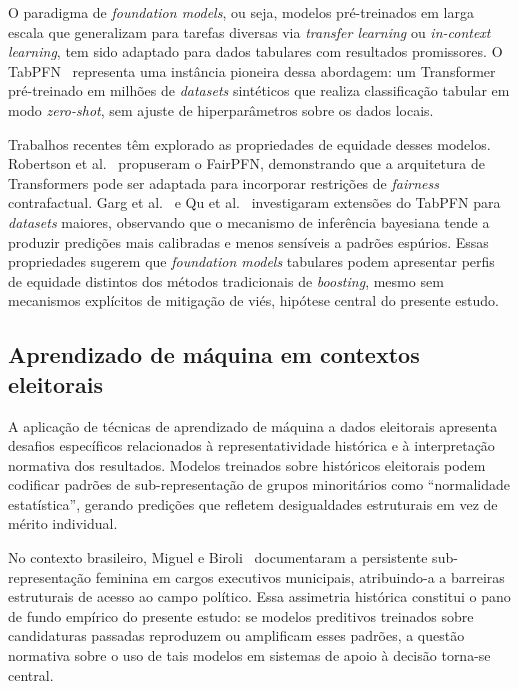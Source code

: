 \documentclass[12pt]{article}
\begin{document}
O paradigma de \textit{foundation models}, ou seja, modelos pré-treinados em larga escala que generalizam para tarefas diversas via \textit{transfer learning} ou \textit{in-context learning}, tem sido adaptado para dados tabulares com resultados promissores. O TabPFN~\cite{hollmann:2022} representa uma instância pioneira dessa abordagem: um Transformer pré-treinado em milhões de \textit{datasets} sintéticos que realiza classificação tabular em modo \textit{zero-shot}, sem ajuste de hiperparâmetros sobre os dados locais.

Trabalhos recentes têm explorado as propriedades de equidade desses modelos. Robertson et al.~\cite{robertson:2024} propuseram o FairPFN, demonstrando que a arquitetura de Transformers pode ser adaptada para incorporar restrições de \textit{fairness} contrafactual. Garg et al.~\cite{garg:2025} e Qu et al.~\cite{qu:2025} investigaram extensões do TabPFN para \textit{datasets} maiores, observando que o mecanismo de inferência bayesiana tende a produzir predições mais calibradas e menos sensíveis a padrões espúrios. Essas propriedades sugerem que \textit{foundation models} tabulares podem apresentar perfis de equidade distintos dos métodos tradicionais de \textit{boosting}, mesmo sem mecanismos explícitos de mitigação de viés, hipótese central do presente estudo.

\subsection{Aprendizado de máquina em contextos eleitorais}

A aplicação de técnicas de aprendizado de máquina a dados eleitorais apresenta desafios específicos relacionados à representatividade histórica e à interpretação normativa dos resultados. Modelos treinados sobre históricos eleitorais podem codificar padrões de sub-representação de grupos minoritários como ``normalidade estatística'', gerando predições que refletem desigualdades estruturais em vez de mérito individual.

No contexto brasileiro, Miguel e Biroli~\cite{miguel:2010} documentaram a persistente sub-representação feminina em cargos executivos municipais, atribuindo-a a barreiras estruturais de acesso ao campo político. Essa assimetria histórica constitui o pano de fundo empírico do presente estudo: se modelos preditivos treinados sobre candidaturas passadas reproduzem ou amplificam esses padrões, a questão normativa sobre o uso de tais modelos em sistemas de apoio à decisão torna-se central.
\end{document}
